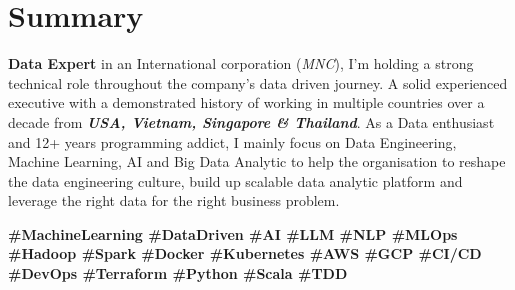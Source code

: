 \section{Summary}
  \textbf{Data Expert} in an International corporation (\emph{MNC}), I’m holding a strong technical role throughout the company’s data driven journey. A solid experienced executive with a demonstrated history of working in multiple countries over a decade from \textbf{\emph{USA, Vietnam, Singapore \& Thailand}}. As a Data enthusiast and 12+ years programming addict, I mainly focus on Data Engineering, Machine Learning, AI and Big Data Analytic to help the organisation to reshape the data engineering culture, build up scalable data analytic platform and leverage the right data for the right business problem.
  
  \textbf{\scriptsize{
    \#MachineLearning
    \#DataDriven
    \#AI
    \#LLM
    \#NLP
    \#MLOps
    \#Hadoop
    \#Spark                                                                                                                                                                                                                                                      
    \#Docker
    \#Kubernetes
    \#AWS
    \#GCP
    \#CI/CD
    \#DevOps
    \#Terraform
    \#Python
    \#Scala
    \#TDD
  }}

